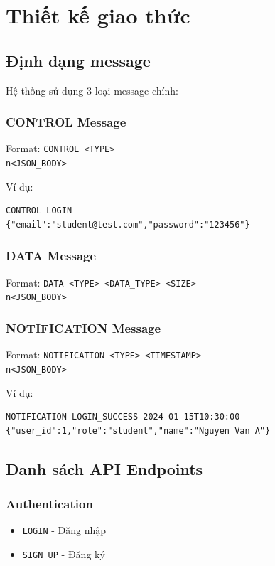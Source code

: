 ﻿\documentclass[12pt,a4paper]{report}
\begin{document}
\section{Thiết kế giao thức}

\subsection{Định dạng message}

Hệ thống sử dụng 3 loại message chính:

\subsubsection{CONTROL Message}
Format: \texttt{CONTROL <TYPE>\\n<JSON\_BODY>}

Ví dụ:
\begin{lstlisting}
CONTROL LOGIN
{"email":"student@test.com","password":"123456"}
\end{lstlisting}

\subsubsection{DATA Message}
Format: \texttt{DATA <TYPE> <DATA\_TYPE> <SIZE>\\n<JSON\_BODY>}

\subsubsection{NOTIFICATION Message}
Format: \texttt{NOTIFICATION <TYPE> <TIMESTAMP>\\n<JSON\_BODY>}

Ví dụ:
\begin{lstlisting}
NOTIFICATION LOGIN_SUCCESS 2024-01-15T10:30:00
{"user_id":1,"role":"student","name":"Nguyen Van A"}
\end{lstlisting}

\subsection{Danh sách API Endpoints}

\subsubsection{Authentication}
\begin{itemize}
    \item \texttt{LOGIN} - Đăng nhập
    \item \texttt{SIGN\_UP} - Đăng ký
\end{itemize}
\end{document}
